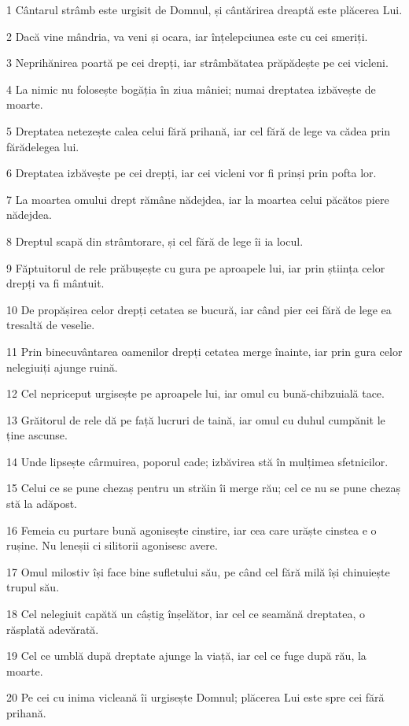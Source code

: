 \par 1 Cântarul strâmb este urgisit de Domnul, și cântărirea dreaptă este plăcerea Lui.
\par 2 Dacă vine mândria, va veni și ocara, iar înțelepciunea este cu cei smeriți.
\par 3 Neprihănirea poartă pe cei drepți, iar strâmbătatea prăpădește pe cei vicleni.
\par 4 La nimic nu folosește bogăția în ziua mâniei; numai dreptatea izbăvește de moarte.
\par 5 Dreptatea netezește calea celui fără prihană, iar cel fără de lege va cădea prin fărădelegea lui.
\par 6 Dreptatea izbăvește pe cei drepți, iar cei vicleni vor fi prinși prin pofta lor.
\par 7 La moartea omului drept rămâne nădejdea, iar la moartea celui păcătos piere nădejdea.
\par 8 Dreptul scapă din strâmtorare, și cel fără de lege îi ia locul.
\par 9 Făptuitorul de rele prăbușește cu gura pe aproapele lui, iar prin știința celor drepți va fi mântuit.
\par 10 De propășirea celor drepți cetatea se bucură, iar când pier cei fără de lege ea tresaltă de veselie.
\par 11 Prin binecuvântarea oamenilor drepți cetatea merge înainte, iar prin gura celor nelegiuiți ajunge ruină.
\par 12 Cel nepriceput urgisește pe aproapele lui, iar omul cu bună-chibzuială tace.
\par 13 Grăitorul de rele dă pe față lucruri de taină, iar omul cu duhul cumpănit le ține ascunse.
\par 14 Unde lipsește cârmuirea, poporul cade; izbăvirea stă în mulțimea sfetnicilor.
\par 15 Celui ce se pune chezaș pentru un străin îi merge rău; cel ce nu se pune chezaș stă la adăpost.
\par 16 Femeia cu purtare bună agonisește cinstire, iar cea care urăște cinstea e o rușine. Nu leneșii ci silitorii agonisesc avere.
\par 17 Omul milostiv își face bine sufletului său, pe când cel fără milă își chinuiește trupul său.
\par 18 Cel nelegiuit capătă un câștig înșelător, iar cel ce seamănă dreptatea, o răsplată adevărată.
\par 19 Cel ce umblă după dreptate ajunge la viață, iar cel ce fuge după rău, la moarte.
\par 20 Pe cei cu inima vicleană îi urgisește Domnul; plăcerea Lui este spre cei fără prihană.
